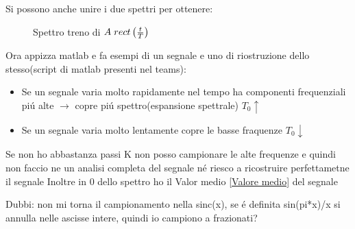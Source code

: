                 Si possono anche unire i due spettri per ottenere: 
                \begin{figure}[H]
                    \centering
                    \caption{Spettro treno di $A\hspace{0.1cm}rect\left(\frac{t}{T}\right)$}
                    \label{fig:Spettro treno di rect}
                \end{figure}  
            Ora appizza matlab e fa esempi di un segnale e uno di riostruzione dello stesso(script di matlab presenti nel teams):
            \begin{itemize}
                \item Se un segnale varia molto rapidamente nel tempo ha componenti frequenziali piú alte $\rightarrow$ copre piú spettro(espansione spettrale) $T_0 \uparrow$
                \item Se un segnale varia molto lentamente copre le basse fraquenze $ T_0 \downarrow$
            \end{itemize}
            Se non ho abbastanza passi K non posso campionare le alte frequenze e quindi non faccio ne un analisi completa del segnale né riesco a ricostruire perfettametne il segnale  
            Inoltre in $0$ dello spettro ho il Valor medio \ref{Valore medio} del segnale


            Dubbi: non mi torna il campionamento nella sinc(x), se é definita sin(pi*x)/x si annulla nelle ascisse intere, quindi io campiono a frazionati?











